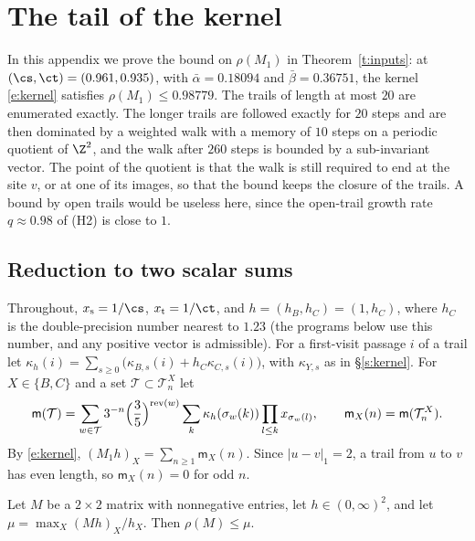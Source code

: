 \section{The tail of the kernel}\label{s:tail}

In this appendix we prove the bound on $\rho(M_1)$ in Theorem~\ref{t:inputs}: at $(\cs, \ct) = (0.961, 0.935)$, with $\bar\alpha = 0.18094$ and $\bar\beta = 0.36751$, the kernel \eqref{e:kernel} satisfies $\rho(M_1) \le 0.98779$. The trails of length at most $20$ are enumerated exactly. The longer trails are followed exactly for $20$ steps and are then dominated by a weighted walk with a memory of $10$ steps on a periodic quotient of $\Z^2$, and the walk after $260$ steps is bounded by a sub-invariant vector. The point of the quotient is that the walk is still required to end at the site $v$, or at one of its images, so that the bound keeps the closure of the trails. A bound by open trails would be useless here, since the open-trail growth rate $q \approx 0.98$ of (H2) is close to $1$.

\subsection{Reduction to two scalar sums}\label{s:tailred}

Throughout, $x_{\mathrm s} = 1/\cs$, $x_{\mathrm t} = 1/\ct$, and $h = (h_B, h_C) = (1, h_C)$, where $h_C$ is the double-precision number nearest to $1.23$ (the programs below use this number, and any positive vector is admissible). For a first-visit passage $i$ of a trail let $\kappa_h(i) = \sum_{s \ge 0} \bigl( \kappa_{B, s}(i) + h_C \kappa_{C, s}(i) \bigr)$, with $\kappa_{Y, s}$ as in \S\ref{s:kernel}. For $X \in \{B, C\}$ and a set $\mathcal T \subset \mathcal T^X_n$ let
\begin{equation}\label{e:mT}
\mathsf m(\mathcal T) = \sum_{w \in \mathcal T} 3^{-n} \Bigl( \frac35 \Bigr)^{\mathrm{rev}(w)} \sum_k \kappa_h(\sigma_w(k)) \prod_{l \le k} x_{\sigma_w(l)}, \qquad \mathsf m_X(n) = \mathsf m(\mathcal T^X_n).
\end{equation}
By \eqref{e:kernel}, $(M_1 h)_X = \sum_{n \ge 1} \mathsf m_X(n)$. Since $|u - v|_1 = 2$, a trail from $u$ to $v$ has even length, so $\mathsf m_X(n) = 0$ for odd $n$.

\begin{lemma}\label{l:CW}
Let $M$ be a $2 \times 2$ matrix with nonnegative entries, let $h \in (0, \infty)^2$, and let $\mu = \max_X (M h)_X / h_X$. Then $\rho(M) \le \mu$.
\end{lemma}

